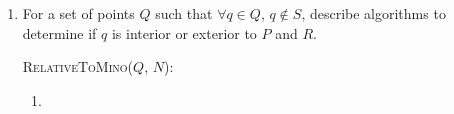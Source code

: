 \documentclass [12pt]{article}
\begin{document}
\begin{enumerate}[label=(\alph*)]
        \item For a set of points $Q$ such that $\forall q \in Q$, $q \notin S$, describe algorithms to determine if $q$ is interior or exterior to $P$ and $R$.
        
            \cbstart
            \textsc{RelativeToMino($Q$, $N$)}:
            \begin{enumerate}[label=\arabic*.]
                \item 
            \end{enumerate}
        \cbend

    \end{enumerate}


    \pagebreak




\end{document}
